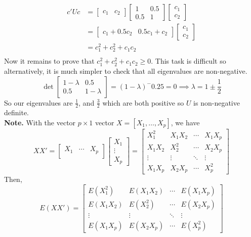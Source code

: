 \begin{align*}
    c'Uc &= \begin{bmatrix}
        c_1 & c_2
    \end{bmatrix}\begin{bmatrix}
        1 & 0.5 \\
        0.5 & 1
    \end{bmatrix}\begin{bmatrix}
        c_1 \\ c_2
    \end{bmatrix}\\
    &= \begin{bmatrix}
        c_1 + 0.5c_2 & 0.5c_1 + c_2
    \end{bmatrix}\begin{bmatrix}
        c_1 \\ c_2
    \end{bmatrix}\\
    &= c_1^2 + c_2^2 + c_1c_2\\
\end{align*}
Now it remains to prove that $c_1^2 + c_2^2 + c_1c_2 \geq 0$. This task is difficult so alternatively, it is much simpler to check that all eigenvalues are non-negative.
\[\det\begin{bmatrix}
    1 - \lambda & 0.5 \\
    0.5 & 1 - \lambda
\end{bmatrix}= (1-\lambda)^ - 0.25 = 0 \implies \lambda = 1 \pm \frac{1}{2}\]
So our eigenvalues are $\frac{1}{2}$, and $\frac{3}{2}$ which are both positive so $U$ is non-negative definite.\\[2ex]
\textbf{Note.} With the vector $p \times 1$ vector $X = [X_1, \ldots, X_p]$, we have 
\[XX' = \begin{bmatrix}
    X_1 & \cdots & X_p\\
\end{bmatrix}\begin{bmatrix}
    X_1 \\ \vdots \\ X_p
\end{bmatrix} = 
\begin{bmatrix}
    X_1^2 & X_1X_2 & \cdots & X_1X_p\\
    X_1X_2 & X_2^2 & \cdots & X_2X_p\\
    \vdots & \vdots & \ddots & \vdots\\
    X_1X_p & X_2X_p & \cdots & X_p^2
\end{bmatrix}\]
Then, 
\[E(XX') = \begin{bmatrix}
    E(X_1^2) & E(X_1X_2) & \cdots & E(X_1X_p)\\
    E(X_1X_2) & E(X_2^2) & \cdots & E(X_2X_p)\\
    \vdots & \vdots & \ddots & \vdots\\
    E(X_1X_p) & E(X_2X_p) & \cdots & E(X_p^2)
\end{bmatrix}\]
